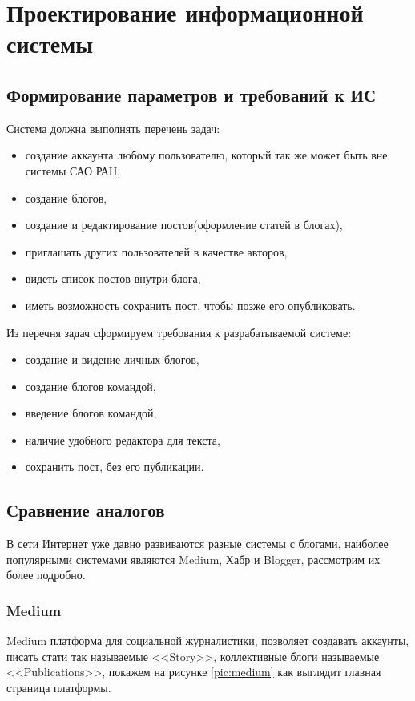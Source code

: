 \section{Проектирование информационной системы}

\subsection{Формирование параметров и требований к ИС}
Система должна выполнять перечень задач:
\begin{itemize}
	\item создание аккаунта любому пользователю, который так же может быть вне системы САО РАН, 
	\item создание блогов,
	\item создание и редактирование постов(оформление статей в блогах),
	\item приглашать других пользователей в качестве авторов,
	\item видеть список постов внутри блога,
	\item иметь возможность сохранить пост, чтобы позже его опубликовать. 
\end{itemize}

Из перечня задач сформируем требования к разрабатываемой системе:
\begin{itemize}
	\item создание и видение личных блогов,
	\item создание блогов командой,
	\item введение блогов командой,
	\item наличие удобного редактора для текста,
	\item сохранить пост, без его публикации. 
\end{itemize}

\subsection{Сравнение аналогов}
В сети Интернет уже давно развиваются разные системы с блогами, наиболее популярными системами являются Medium, Хабр и Blogger, рассмотрим их более подробно.

\pagebreak
\subsubsection{Medium}
Medium платформа для социальной журналистики, позволяет создавать аккаунты, писать стати так называемые <<Story>>, коллективные блоги называемые <<Publications>>, покажем на рисунке \ref{pic:medium} как выглядит главная страница платформы.





 



\pagebreak